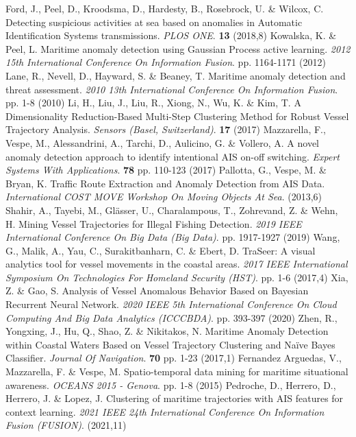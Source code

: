 Ford, J., Peel, D., Kroodsma, D., Hardesty, B., Rosebrock, U. \& Wilcox, C. Detecting suspicious activities at sea based on anomalies in Automatic Identification Systems transmissions. {\em PLOS ONE}. \textbf{13} (2018,8)
Kowalska, K. \& Peel, L. Maritime anomaly detection using Gaussian Process active learning. {\em 2012 15th International Conference On Information Fusion}. pp. 1164-1171 (2012)
Lane, R., Nevell, D., Hayward, S. \& Beaney, T. Maritime anomaly detection and threat assessment. {\em 2010 13th International Conference On Information Fusion}. pp. 1-8 (2010)
Li, H., Liu, J., Liu, R., Xiong, N., Wu, K. \& Kim, T. A Dimensionality Reduction-Based Multi-Step Clustering Method for Robust Vessel Trajectory Analysis. {\em Sensors (Basel, Switzerland)}. \textbf{17} (2017)
Mazzarella, F., Vespe, M., Alessandrini, A., Tarchi, D., Aulicino, G. \& Vollero, A. A novel anomaly detection approach to identify intentional AIS on-off switching. {\em Expert Systems With Applications}. \textbf{78} pp. 110-123 (2017)
Pallotta, G., Vespe, M. \& Bryan, K. Traffic Route Extraction and Anomaly Detection from AIS Data. {\em International COST MOVE Workshop On Moving Objects At Sea}. (2013,6)
Shahir, A., Tayebi, M., Glässer, U., Charalampous, T., Zohrevand, Z. \& Wehn, H. Mining Vessel Trajectories for Illegal Fishing Detection. {\em 2019 IEEE International Conference On Big Data (Big Data)}. pp. 1917-1927 (2019)
Wang, G., Malik, A., Yau, C., Surakitbanharn, C. \& Ebert, D. TraSeer: A visual analytics tool for vessel movements in the coastal areas. {\em 2017 IEEE International Symposium On Technologies For Homeland Security (HST)}. pp. 1-6 (2017,4)
Xia, Z. \& Gao, S. Analysis of Vessel Anomalous Behavior Based on Bayesian Recurrent Neural Network. {\em 2020 IEEE 5th International Conference On Cloud Computing And Big Data Analytics (ICCCBDA)}. pp. 393-397 (2020)
Zhen, R., Yongxing, J., Hu, Q., Shao, Z. \& Nikitakos, N. Maritime Anomaly Detection within Coastal Waters Based on Vessel Trajectory Clustering and Naïve Bayes Classifier. {\em Journal Of Navigation}. \textbf{70} pp. 1-23 (2017,1)
Fernandez Arguedas, V., Mazzarella, F. \& Vespe, M. Spatio-temporal data mining for maritime situational awareness. {\em OCEANS 2015 - Genova}. pp. 1-8 (2015)
Pedroche, D., Herrero, D., Herrero, J. \& Lopez, J. Clustering of maritime trajectories with AIS features for context learning. {\em 2021 IEEE 24th International Conference On Information Fusion (FUSION)}. (2021,11)
